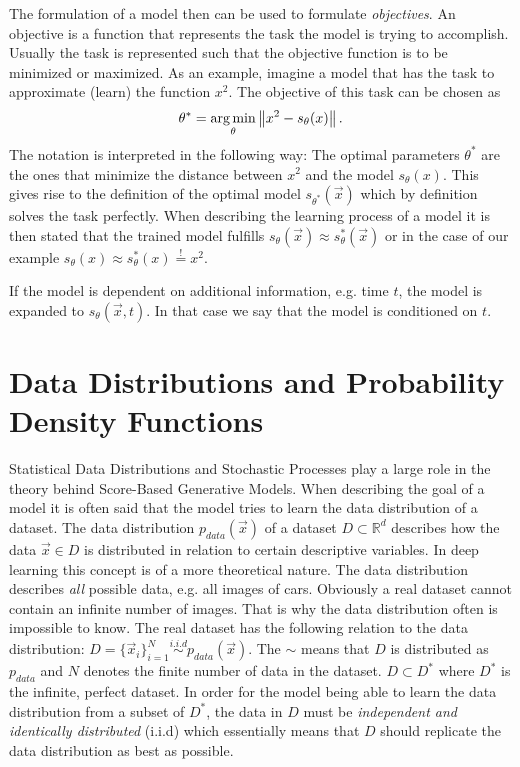 The formulation of a model then can be used to formulate \textit{objectives}. An objective is a function that represents the task the model is trying to accomplish. Usually the task is represented such that the objective function is to be minimized or maximized. As an example, imagine a model that has the task to approximate (learn) the function $x^2$. The objective of this task can be chosen as
%
\begin{equation} 
    \theta^*=\underset{\theta}{\arg \min}\left\lVert x^2-s_\theta(x)\right\rVert.
\end{equation}
%
The notation is interpreted in the following way: The optimal parameters $\theta^*$ are the ones that minimize the distance between $x^2$ and the model $s_\theta(x)$. This gives rise to the definition of the optimal model $s_{\theta^*}(\vec{x})$ which by definition solves the task perfectly. When describing the learning process of a model it is then stated that the trained model fulfills $s_\theta(\vec{x})\approx s_{\theta}^*(\vec{x})$ or in the case of our example $s_\theta(x)\approx s_{\theta}^*(x)\overset{!}{=}x^2$.

If the model is dependent on additional information, e.g. time $t$, the model is expanded to $s_\theta(\vec{x}, t)$. In that case we say that the model is conditioned on $t$.
%
\section[Data Distributions and Probability Density Functions]{Data Distributions and Probability Density Functions%
    } \label{sec:3.3}
Statistical Data Distributions and Stochastic Processes play a large role in the theory behind Score-Based Generative Models. When describing the goal of a model it is often said that the model tries to learn the data distribution of a dataset. The data distribution $p_{data}(\vec{x})$ of a dataset $D\subset\mathbb{R}^d$  describes how the data $\vec{x}\in D$ is distributed in relation to certain descriptive variables. In deep learning this concept is of a more theoretical nature. The data distribution describes \textit{all} possible data, e.g. all images of cars. Obviously a real dataset cannot contain an infinite number of images. That is why the data distribution often is impossible to know. The real dataset has the following relation to the data distribution: $D=\{\vec{x}_i\}_{i=1}^N\overset{i.i.d}{\sim}p_{data}(\vec{x})$. The $\sim$ means that $D$ is distributed as $p_{data}$ and $N$ denotes the finite number of data in the dataset. $D\subset D^*$ where $D^*$ is the infinite, perfect dataset. In order for the model being able to learn the data distribution from a subset of $D^*$, the data in $D$ must be \textit{independent and identically distributed} (i.i.d) which essentially means that $D$ should replicate the data distribution as best as possible.

